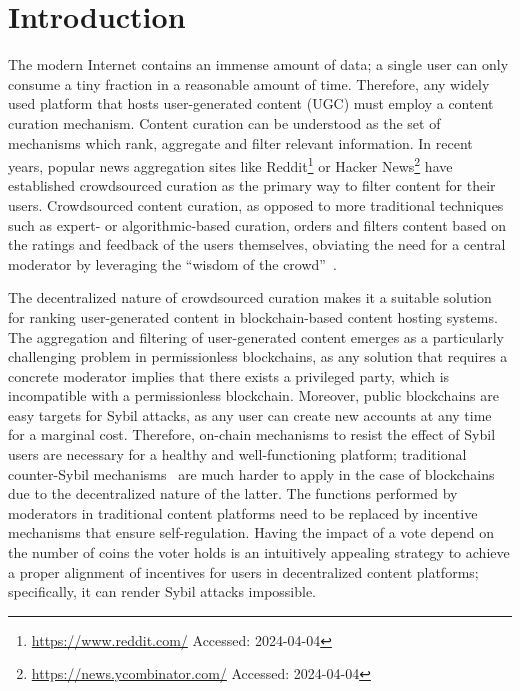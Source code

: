 \section{Introduction}
  The modern Internet contains an immense amount of data; a single user can only consume a tiny fraction in a reasonable amount of time. Therefore, any widely used platform that hosts user-generated content (UGC) must employ a content curation mechanism.
   Content curation can be understood as the set of mechanisms which rank, aggregate and filter relevant information. In recent years, popular news aggregation sites like Reddit\footnote{\url{https://www.reddit.com/} Accessed: 2024-04-04} or Hacker News\footnote{\url{https://news.ycombinator.com/} Accessed: 2024-04-04} have established crowdsourced curation as the primary way to filter content for their users.
   Crowdsourced content curation, as opposed to more traditional techniques such as expert- or algorithmic-based curation, orders and filters content based on the ratings and feedback of the users themselves, obviating the need for a central moderator by leveraging the ``wisdom of the crowd''~\cite{askalidis2013theoretical}.

  The decentralized nature of crowdsourced curation makes it a suitable solution for ranking user-generated content in blockchain-based content hosting systems. The aggregation and filtering of user-generated content emerges as a particularly challenging problem in permissionless blockchains, as any solution that requires a concrete moderator implies that there exists a privileged party, which is incompatible with a permissionless blockchain.
   Moreover, public blockchains are easy targets for Sybil attacks, as any user can create new accounts at any time for a marginal cost.
    Therefore, on-chain mechanisms to resist the effect of Sybil users are necessary for a healthy and well-functioning platform; traditional counter-Sybil mechanisms~\cite{levine2006survey} are much harder to apply in the case of blockchains due to the decentralized nature of the latter.
   The functions performed by moderators in traditional content platforms need to be replaced by incentive mechanisms that ensure self-regulation. Having the impact of a vote depend on the number of coins the voter holds is an intuitively appealing strategy to achieve a proper alignment of incentives for users in decentralized content platforms; specifically, it can render Sybil attacks impossible.

